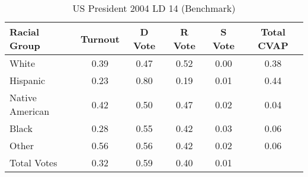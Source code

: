 \begin{table}[htb]
\begin{center}
\caption{US President 2004 LD 14 (Benchmark)}
\label{pres04_cvap_ld_14_benchmark}
\begin{tabular}{lccccc}
  \hline
Racial Group & Turnout & D Vote & R Vote & S Vote & Total CVAP \\ 
  \hline
White & 0.39 & 0.47 & 0.52 & 0.00 & 0.38 \\ 
  Hispanic & 0.23 & 0.80 & 0.19 & 0.01 & 0.44 \\ 
  Native American & 0.42 & 0.50 & 0.47 & 0.02 & 0.04 \\ 
  Black & 0.28 & 0.55 & 0.42 & 0.03 & 0.06 \\ 
  Other & 0.56 & 0.56 & 0.42 & 0.02 & 0.06 \\ 
  Total Votes & 0.32 & 0.59 & 0.40 & 0.01 &  \\ 
   \hline
\end{tabular}
\end{center}
\end{table}
